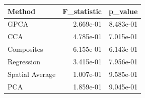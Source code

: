 \begin{tabular}{lrr}
\toprule
Method & F_statistic & p_value \\
\midrule
GPCA & 2.669e-01 & 8.483e-01 \\
CCA & 4.785e-01 & 7.015e-01 \\
Composites & 6.155e-01 & 6.143e-01 \\
Regression & 3.415e-01 & 7.956e-01 \\
Spatial Average & 1.007e-01 & 9.585e-01 \\
PCA & 1.859e-01 & 9.045e-01 \\
\bottomrule
\end{tabular}
